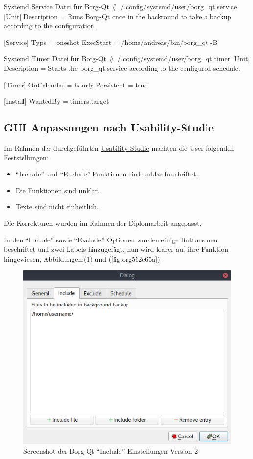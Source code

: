 \begin{sexylisting}[label=org686435b]{Systemd Service Datei für Borg-Qt}
#~/.config/systemd/user/borg_qt.service
[Unit]
Description = Runs Borg-Qt once in the backround to take a backup according to the configuration.

[Service]
Type = oneshot
ExecStart = /home/andreas/bin/borg_qt -B
\end{sexylisting}

\begin{sexylisting}[label=orgc9b6ece]{Systemd Timer Datei für Borg-Qt}
#~/.config/systemd/user/borg_qt.timer
[Unit]
Description = Starts the borg_qt.service according to the configured schedule.

[Timer]
OnCalendar = hourly
Persistent = true

[Install]
WantedBy = timers.target
\end{sexylisting}

\subsection{GUI Anpassungen nach Usability-Studie}
\label{sec:org7b2251d}

Im Rahmen der durchgeführten \hyperref[sec:org4a36f83]{Usability-Studie} machten die User folgenden
Feststellungen:
\begin{itemize}
\item "`Include"' und "`Exclude"' Funktionen sind unklar beschriftet.
\item Die Funktionen sind unklar.
\item Texte sind nicht einheitlich.
\end{itemize}

Die Korrekturen wurden im Rahmen der Diplomarbeit angepasst.

In den "`Include"' sowie "`Exclude"' Optionen wurden einige Buttons neu beschriftet
und zwei Labels hinzugefügt, nun wird klarer auf ihre Funktion hingewiesen,
Abbildungen:(\ref{fig:org7af081d}) und
(\ref{fig:org562e65a}).

\begin{figure}[H]
\centering
\includegraphics[width=.9\linewidth]{pictures/borgqt_settings_include_v2.png}
\caption{\label{fig:org7af081d}
Screenshot der Borg-Qt "`Include"' Einstellungen Version 2}
\end{figure}

